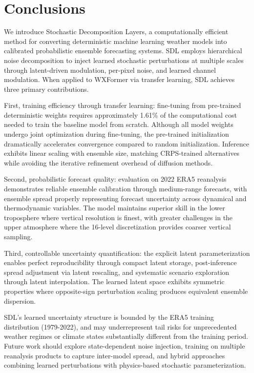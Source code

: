 \documentclass{agujournal2019}
\begin{document}
\section{Conclusions}

We introduce Stochastic Decomposition Layers, a computationally efficient method for converting deterministic machine learning weather models into calibrated probabilistic ensemble forecasting systems. SDL employs hierarchical noise decomposition to inject learned stochastic perturbations at multiple scales through latent-driven modulation, per-pixel noise, and learned channel modulation. When applied to WXFormer via transfer learning, SDL achieves three primary contributions.

First, training efficiency through transfer learning: fine-tuning from pre-trained deterministic weights requires approximately 1.61\% of the computational cost needed to train the baseline model from scratch. Although all model weights undergo joint optimization during fine-tuning, the pre-trained initialization dramatically accelerates convergence compared to random initialization. Inference exhibits linear scaling with ensemble size, matching CRPS-trained alternatives while avoiding the iterative refinement overhead of diffusion methods.

Second, probabilistic forecast quality: evaluation on 2022 ERA5 reanalysis demonstrates reliable ensemble calibration through medium-range forecasts, with ensemble spread properly representing forecast uncertainty across dynamical and thermodynamic variables. The model maintains superior skill in the lower troposphere where vertical resolution is finest, with greater challenges in the upper atmosphere where the 16-level discretization provides coarser vertical sampling.

Third, controllable uncertainty quantification: the explicit latent parameterization enables perfect reproducibility through compact latent storage, post-inference spread adjustment via latent rescaling, and systematic scenario exploration through latent interpolation. The learned latent space exhibits symmetric properties where opposite-sign perturbation scaling produces equivalent ensemble dispersion.

SDL's learned uncertainty structure is bounded by the ERA5 training distribution (1979-2022), and may underrepresent tail risks for unprecedented weather regimes or climate states substantially different from the training period. Future work should explore state-dependent noise injection, training on multiple reanalysis products to capture inter-model spread, and hybrid approaches combining learned perturbations with physics-based stochastic parameterization.
\end{document}
